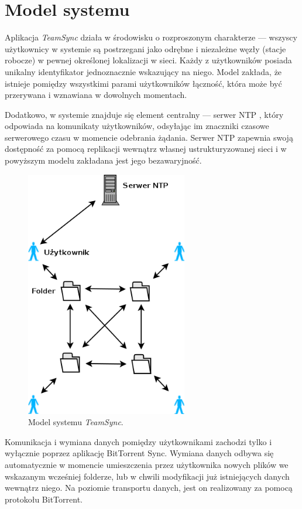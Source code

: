 \chapter{Model systemu}

Aplikacja \emph{TeamSync} działa w środowisku o rozproszonym charakterze --- wszyscy użytkownicy w systemie są postrzegani jako odrębne i niezależne węzły (stacje robocze) w pewnej określonej lokalizacji w sieci. Każdy z użytkowników posiada unikalny identyfikator jednoznacznie wskazujący na niego. Model zakłada, że istnieje pomiędzy wszystkimi parami użytkowników łączność, która może być przerywana i wznawiana w dowolnych momentach.

Dodatkowo, w systemie znajduje się element centralny --- serwer NTP \cite{ntp} \cite{ntparticle}, który odpowiada na komunikaty użytkowników, odsyłając im znaczniki czasowe serwerowego czasu w momencie odebrania żądania. Serwer NTP zapewnia swoją dostępność za pomocą replikacji wewnątrz własnej ustrukturyzowanej sieci i w powyższym modelu zakładana jest jego bezawaryjność.

\begin{figure}[htb]
  \vspace{5pt}
  \begin{center}
    \includegraphics[width=200pt]{figures/model.png}
  \end{center}
  \caption{Model systemu \emph{TeamSync}.}
\end{figure}

Komunikacja i wymiana danych pomiędzy użytkownikami zachodzi tylko i wyłącznie poprzez aplikację BitTorrent Sync. Wymiana danych odbywa się automatycznie w momencie umieszczenia przez użytkownika nowych plików we wskazanym wcześniej folderze, lub w chwili modyfikacji już istniejących danych wewnątrz niego. Na poziomie transportu danych, jest on realizowany za pomocą protokołu BitTorrent.

